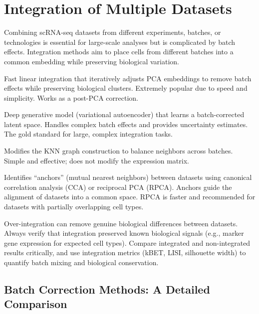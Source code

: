 \section{Integration of Multiple Datasets}
\label{sec:scrnaseq:integration}

Combining scRNA-seq datasets from different experiments, batches, or
technologies is essential for large-scale analyses but is complicated by
batch effects. Integration methods aim to place cells from different batches
into a common embedding while preserving biological variation.

\begin{description}[style=nextline]
  \item[\software{Harmony}] Fast linear integration that iteratively adjusts
    PCA embeddings to remove batch effects while preserving biological clusters.
    Extremely popular due to speed and simplicity. Works as a post-PCA
    correction.
  \item[\software{scVI} (Variational Inference)] Deep generative model
    (variational autoencoder) that learns a batch-corrected latent space.
    Handles complex batch effects and provides uncertainty estimates. The gold
    standard for large, complex integration tasks.
  \item[\software{BBKNN} (Batch Balanced KNN)] Modifies the KNN graph
    construction to balance neighbors across batches. Simple and effective;
    does not modify the expression matrix.
  \item[Seurat integration (CCA/RPCA)] Identifies ``anchors'' (mutual nearest
    neighbors) between datasets using canonical correlation analysis (CCA) or
    reciprocal PCA (RPCA). Anchors guide the alignment of datasets into a
    common space. RPCA is faster and recommended for datasets with partially
    overlapping cell types.
\end{description}

\begin{warningbox}
Over-integration can remove genuine biological differences between datasets.
Always verify that integration preserved known biological signals (e.g., marker
gene expression for expected cell types). Compare integrated and non-integrated
results critically, and use integration metrics (kBET, LISI, silhouette width)
to quantify batch mixing and biological conservation.
\end{warningbox}

\subsection{Batch Correction Methods: A Detailed Comparison}
\label{subsec:scrnaseq:batch_correction}

